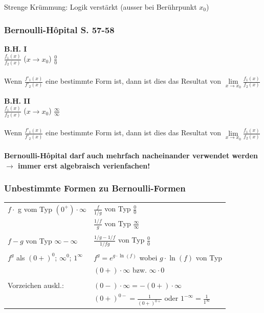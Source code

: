 			Strenge Krümmung: Logik verstärkt (ausser bei Berührpunkt $x_0$)				
			
			
		\subsubsection{Bernoulli-Hôpital S. 57-58}	
		\textbf{B.H. I}\\
		$\frac{f_1(x)}{f_2(x)}$ \quad ($ x\rightarrow x_0$) \quad $\frac{0}{0}$ \\
		\\
		Wenn $\frac{f'_1(x)}{f'_2(x)}$ eine bestimmte Form ist, dann ist dies das Resultat von $\lim \limits_{x \to x_0} \frac{f_1(x)}{f_2(x)}$
		
		\textbf{B.H. II}	\\
		$\frac{f_1(x)}{f_2(x)}$ \quad ($x\rightarrow x_0$) \quad $\frac{\infty}{\infty}$		\\
		\\
		Wenn $\frac{f'_1(x)}{f'_2(x)}$ eine bestimmte Form ist, dann ist dies das Resultat von $\lim \limits_{x \to x_0} \frac{f_1(x)}{f_2(x)}$ \\
		\\
		\textbf{Bernoulli-Hôpital darf auch mehrfach nacheinander verwendet werden $\rightarrow$ immer erst algebraisch verienfachen!} 
		
		\subsubsection{Unbestimmte Formen zu Bernoulli-Formen}		
		\begin{tabular}{ll}
		$f \cdot$ g vom Typ $(0^+) \cdot \infty$ & $\frac{f}{1 / g}$ von Typ $\frac{0}{0}$ \\
		&   $\frac{1 / f}{g}$ von Typ $\frac{\infty}{\infty}$ \\
		\\
		$f - g$ von Typ $\infty - \infty$ & $\frac{1/g - 1/f}{1/ fg}$ von Typ $\frac{0}{0}$   \\
		\\
		$f^g$ als $(0+)^0$; $\infty^0$; $1^{\infty}$ & $f^g = e^{g \cdot \ln(f)}$ wobei $g \cdot \ln(f)$ von Typ \\
		& $(0+) \cdot \infty$ bzw. $ \infty \cdot 0$ \\
		\\
		Vorzeichen auskl.: & $(0-) \cdot \infty = -(0+) \cdot \infty$ \\
		& $(0+)^{0-} = \frac{1}{(0+)^{0+}}$ oder $1^{-\infty} = \frac{1}{1^{\infty}}$\\
		\end{tabular}
		
